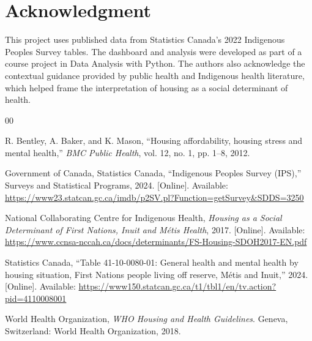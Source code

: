 \documentclass[conference]{IEEEtran}
\begin{document}
\section*{Acknowledgment}

This project uses published data from Statistics Canada's 2022 Indigenous Peoples Survey tables. The dashboard and analysis were developed as part of a course project in Data Analysis with Python. The authors also acknowledge the contextual guidance provided by public health and Indigenous health literature, which helped frame the interpretation of housing as a social determinant of health.

\begin{thebibliography}{00}

R. Bentley, A. Baker, and K. Mason, ``Housing affordability, housing stress and mental health,'' \emph{BMC Public Health}, vol. 12, no. 1, pp. 1--8, 2012.

Government of Canada, Statistics Canada, ``Indigenous Peoples Survey (IPS),'' Surveys and Statistical Programs, 2024. [Online]. Available: \url{https://www23.statcan.gc.ca/imdb/p2SV.pl?Function=getSurvey&SDDS=3250}

National Collaborating Centre for Indigenous Health, \emph{Housing as a Social Determinant of First Nations, Inuit and M\'etis Health}, 2017. [Online]. Available: \url{https://www.ccnsa-nccah.ca/docs/determinants/FS-Housing-SDOH2017-EN.pdf}

Statistics Canada, ``Table 41-10-0080-01: General health and mental health by housing situation, First Nations people living off reserve, M\'etis and Inuit,'' 2024. [Online]. Available: \url{https://www150.statcan.gc.ca/t1/tbl1/en/tv.action?pid=4110008001}

World Health Organization, \emph{WHO Housing and Health Guidelines}. Geneva, Switzerland: World Health Organization, 2018.

\end{thebibliography}
\end{document}
